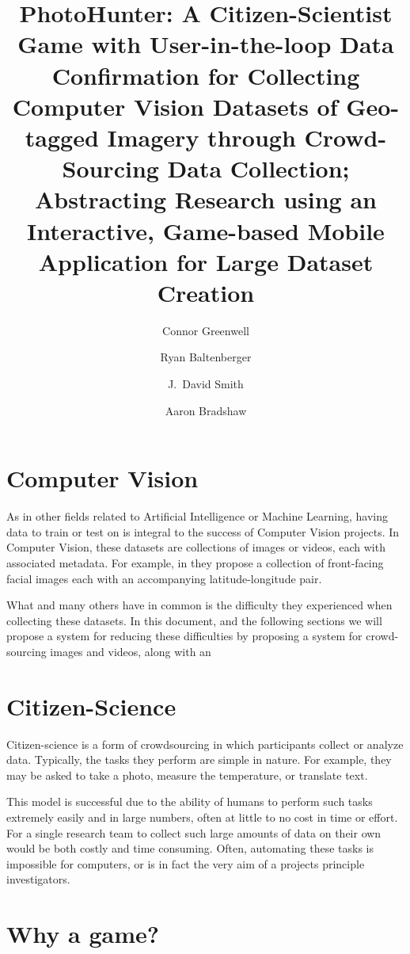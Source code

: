 \documentclass[aspectratio=169]{beamer}
\title[PhotoHunter]{PhotoHunter: A Citizen-Scientist Game with User-in-the-loop 
  Data Confirmation for Collecting Computer Vision Datasets of 
  Geo-tagged Imagery through Crowd-Sourcing Data Collection; 
  Abstracting Research using an Interactive, Game-based Mobile 
  Application for Large Dataset Creation}
\author[]{Connor Greenwell \and Ryan Baltenberger 
  \and J.\ David Smith \and Aaron Bradshaw}
\institute{QuesoTech.com}
\begin{document}
\maketitle

\section{Computer Vision}

\begin{frame}
  As in other fields related to Artificial Intelligence or Machine
  Learning, having data to train or test on is integral to the success
  of Computer Vision projects. In Computer Vision, these datasets are 
  collections of images or videos, each with
  associated metadata. For example, in \cite{islam2014geofaces} they
  propose a collection of front-facing facial images each with an
  accompanying latitude-longitude pair. 

  What \cite{islam2014geofaces} and many others have in common
  is the difficulty they experienced when collecting these datasets.
  In
  this document, and the following sections we will propose a system
  for
  reducing these difficulties by proposing a system for crowd-sourcing
  images and videos, along with an 
\end{frame}

\section{Citizen-Science}

\begin{frame}
  Citizen-science is a form of crowdsourcing in which participants
  collect or analyze data. Typically, the tasks they perform are
  simple
  in nature. For example, they may be asked to take a photo, measure
  the 
  temperature, or translate text.

  This model is successful due to the ability of humans to perform
  such
  tasks extremely easily and in large numbers, often at little to no
  cost in time or effort. For a single research team to collect such
  large amounts of data on their own would be both costly and time
  consuming. Often, automating these tasks is impossible for
  computers,
  or is in fact the very aim of a projects principle investigators.
\end{frame}

\section{Why a game?}
\end{document}
